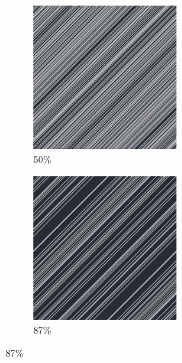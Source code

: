 \documentclass[12pt, fleqn]{report}                             %
\theoremstyle{break}                                            %
\begin{document}
\begin{figure}[ht!]
\begin{subfigure}[b]{0.4\linewidth}
          \includegraphics[width=0.6\textwidth]{Images/46/c.png}
          \caption{50\%}
        \end{subfigure}
        \begin{subfigure}[b]{0.4\linewidth}
          \includegraphics[width=0.6\textwidth]{Images/46/d.png}
          \caption{87\%}
        \end{subfigure}
      \end{figure}
\end{document}
